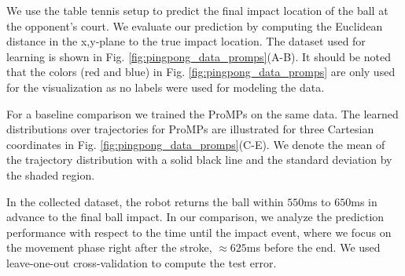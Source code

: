 
We use the table tennis setup to predict the final impact location
of the ball at the opponent's court. We evaluate our prediction by computing the
Euclidean distance in the x,y-plane to the true impact location. The dataset
used for learning is shown in Fig. \ref{fig:pingpong_data_promps}(A-B).  It
should be noted that the colors (red and blue) in Fig.
\ref{fig:pingpong_data_promps} are only used for the visualization as no labels
were used for modeling the data. 

For a baseline comparison we trained the ProMPs on the same data. 
The learned distributions over trajectories for ProMPs are illustrated for three Cartesian coordinates in Fig.
\ref{fig:pingpong_data_promps}(C-E). We denote the mean of the trajectory
distribution with a solid black line and the standard deviation by the shaded
region. 

In the collected dataset, the robot returns the ball within $550$ms to $650$ms in
advance to the final ball impact.  In our comparison, we analyze the prediction
performance with respect to the time until the impact event, where we focus on
the movement phase right after the stroke, $\approx 625$ms before the end. We
used leave-one-out cross-validation to compute the test error.






